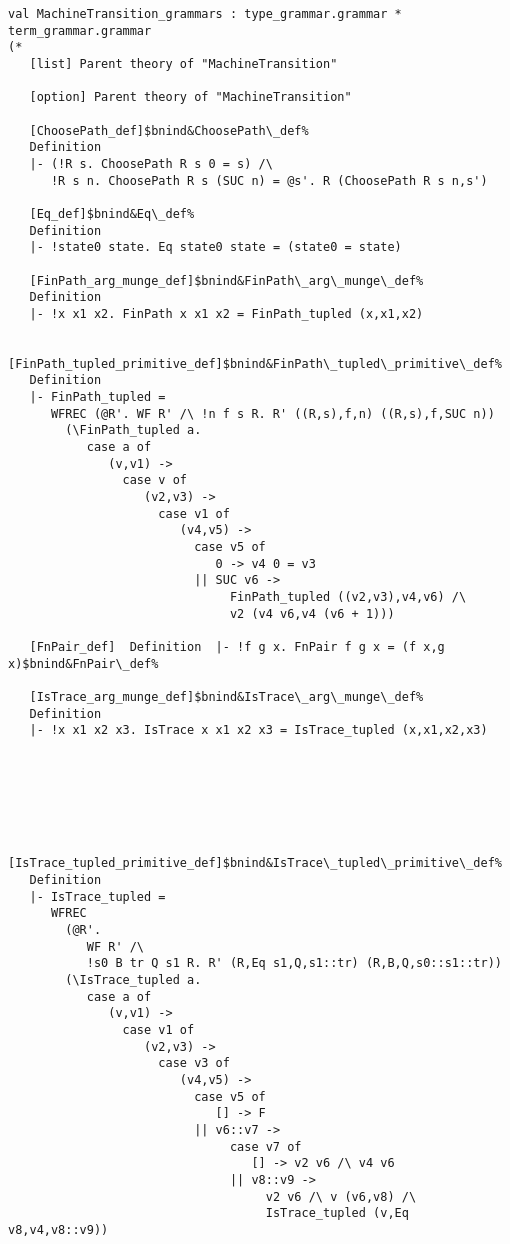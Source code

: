 \documentclass[12pt]{article}
\begin{document}
\begin{footnotesize}
\begin{Verbatim}[commandchars=\$\&\%]
  val MachineTransition_grammars : type_grammar.grammar * term_grammar.grammar
(*
   [list] Parent theory of "MachineTransition"
   
   [option] Parent theory of "MachineTransition"
   
   [ChoosePath_def]$bnind&ChoosePath\_def%
   Definition
   |- (!R s. ChoosePath R s 0 = s) /\
      !R s n. ChoosePath R s (SUC n) = @s'. R (ChoosePath R s n,s')
   
   [Eq_def]$bnind&Eq\_def%
   Definition
   |- !state0 state. Eq state0 state = (state0 = state)
   
   [FinPath_arg_munge_def]$bnind&FinPath\_arg\_munge\_def%
   Definition
   |- !x x1 x2. FinPath x x1 x2 = FinPath_tupled (x,x1,x2)
   
   [FinPath_tupled_primitive_def]$bnind&FinPath\_tupled\_primitive\_def%
   Definition
   |- FinPath_tupled =
      WFREC (@R'. WF R' /\ !n f s R. R' ((R,s),f,n) ((R,s),f,SUC n))
        (\FinPath_tupled a.
           case a of
              (v,v1) ->
                case v of
                   (v2,v3) ->
                     case v1 of
                        (v4,v5) ->
                          case v5 of
                             0 -> v4 0 = v3
                          || SUC v6 ->
                               FinPath_tupled ((v2,v3),v4,v6) /\
                               v2 (v4 v6,v4 (v6 + 1)))
   
   [FnPair_def]  Definition  |- !f g x. FnPair f g x = (f x,g x)$bnind&FnPair\_def%
   
   [IsTrace_arg_munge_def]$bnind&IsTrace\_arg\_munge\_def%
   Definition
   |- !x x1 x2 x3. IsTrace x x1 x2 x3 = IsTrace_tupled (x,x1,x2,x3)
   





   [IsTrace_tupled_primitive_def]$bnind&IsTrace\_tupled\_primitive\_def%
   Definition
   |- IsTrace_tupled =
      WFREC
        (@R'.
           WF R' /\
           !s0 B tr Q s1 R. R' (R,Eq s1,Q,s1::tr) (R,B,Q,s0::s1::tr))
        (\IsTrace_tupled a.
           case a of
              (v,v1) ->
                case v1 of
                   (v2,v3) ->
                     case v3 of
                        (v4,v5) ->
                          case v5 of
                             [] -> F
                          || v6::v7 ->
                               case v7 of
                                  [] -> v2 v6 /\ v4 v6
                               || v8::v9 ->
                                    v2 v6 /\ v (v6,v8) /\
                                    IsTrace_tupled (v,Eq v8,v4,v8::v9))
   

\end{Verbatim}
\end{footnotesize}
\end{document}
